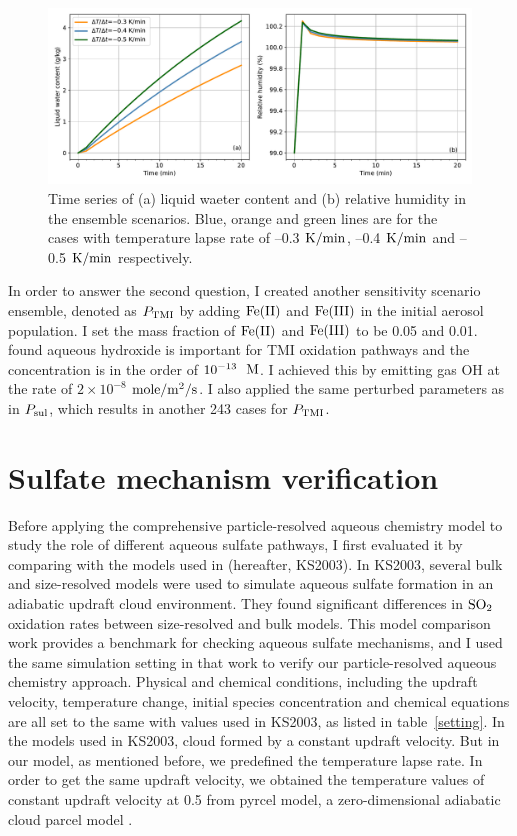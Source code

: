 \documentclass[edeposit,fullpage]{uiucthesis2009}
\makeatletter
\DeclareRobustCommand*\unit[1]
 {\ensuremath{%
   {\thinmuskip3mu\relax
    \def\mu{\text{\textmu}}\def~{\,}%
    \ifx\f@series\testbx\mathbf{#1}\else\mathrm{#1}\fi}}}
\makeatother
\begin{document}
\begin{figure}[ht]
    \centering \includegraphics[scale=0.55]{chap2_figs/chap2_mono_lwc_rh.pdf}
    \caption{Time series of (a) liquid waeter content and (b) relative humidity in the ensemble scenarios. Blue, orange and green lines are for the cases with temperature lapse rate of --0.3 \unit{K/min}, --0.4 \unit{K/min} and --0.5 \unit{K/min} respectively.}
    \label{chap2:ensemrh}
\end{figure}

In order to answer the second question, I created another sensitivity scenario ensemble, denoted as $P_{\rm TMI}$ by adding $\rm Fe(II)$ and $\rm Fe(III)$ in the initial aerosol population. I set the mass fraction of $\rm Fe(II)$ and $\rm Fe(III)$ to be 0.05 and 0.01. \citet{deguillaume2004role} found aqueous hydroxide is important for TMI oxidation pathways and the concentration is in the order of $\rm 10^{-13}$~\unit{M}. I achieved this by emitting gas OH at the rate of $2\times 10^{-8}$ \unit{mole/m^2/s}. I also applied the same perturbed parameters as in $P_{\rm sul}$, which results in another 243 cases for $P_{\rm TMI}$. 

\section{Sulfate mechanism verification}
\label{chap2.3}
Before applying the comprehensive particle-resolved aqueous chemistry model to study the role of different aqueous sulfate pathways, I first evaluated it by comparing with the models used in \citet{kreidenweis2003modification}(hereafter, KS2003). In KS2003, several bulk and size-resolved models were used to simulate aqueous sulfate formation in an adiabatic updraft cloud environment. They found significant differences in $\rm SO_2$ oxidation rates between size-resolved and bulk models. This model comparison work provides a benchmark for checking aqueous sulfate mechanisms, and I used the same simulation setting in that work to verify our particle-resolved aqueous chemistry approach. Physical and chemical conditions, including the updraft velocity, temperature change, initial species concentration and chemical equations are all set to the same with values used in KS2003, as listed in table~\ref{setting}. In the models used in KS2003, cloud formed by a constant updraft velocity. But in our model, as mentioned before, we predefined the temperature lapse rate. In order to get the same updraft velocity, we obtained the temperature values of constant updraft velocity at 0.5 from pyrcel model, a zero-dimensional adiabatic cloud parcel model \citep{rothenberg2016metamodeling}. 
\end{document}
